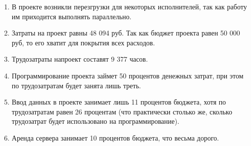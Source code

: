 \begin{enumerate}
    \item В проекте возникли перезгрузки для некоторых исполнителей, так как работу им приходится выполнять параллельно.
    \item Затраты на проект равны 48 094 руб. Так как бюджет проекта равен 50 000 руб, то его хватит для покрытия всех расходов.
    \item Трудозатраты напроект составят 9 377 часов.
    \item Программирование проекта займет 50 процентов денежных затрат, при этом по трудозатратам будет занята лишь треть.
    \item Ввод данных в проекте занимает лишь 11 процентов бюджета, хотя по трудозатратам равен 26 процентам (что практически столько же, сколько трудозатрат будет использовано на программирование).
    \item Аренда сервера занимает 10 процентов бюджета, что весьма дорого.
\end{enumerate}
